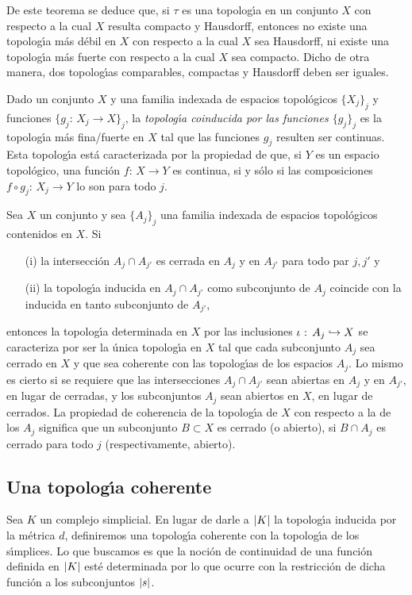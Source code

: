 De este teorema se deduce que, si $\tau$ es una topolog\'{\i}a en un conjunto
$X$ con respecto a la cual $X$ resulta compacto y Hausdorff, entonces
no existe una topolog\'{\i}a m\'{a}s d\'{e}bil en $X$ con respecto a la
cual $X$ sea Hausdorff, ni existe una topolog\'{\i}a m\'{a}s fuerte con
respecto a la cual $X$ sea compacto. Dicho de otra manera, dos topolog\'{\i}as
comparables, compactas y Hausdorff deben ser iguales.

Dado un conjunto $X$ y una familia indexada de espacios topol\'{o}gicos
$\{X_{j}\}_{j}$ y funciones $\{g_{j}:\,X_{j}\rightarrow X\}_{j}$, la
\emph{topolog\'{\i}a coinducida por las funciones $\{g_{j}\}_{j}$}
es la topolog\'{\i}a m\'{a}s fina/fuerte en $X$ tal que las funciones $g_{j}$
resulten ser continuas. Esta topolog\'{\i}a est\'{a} caracterizada por la
propiedad de que, si $Y$ es un espacio topol\'{o}gico, una funci\'{o}n
$f:\,X\rightarrow Y$ es continua, si y s\'{o}lo si las composiciones
$f\circ g_{j}:\,X_{j}\rightarrow Y$ lo son para todo $j$.

\begin{teoTopologiaCoherente}\label{thm:topologiacoherente}
	Sea $X$ un conjunto y sea $\{A_{j}\}_{j}$ una familia indexada de
	espacios topol\'{o}gicos contenidos en $X$. Si
	\begin{itemize}
		\item[(i)] la intersecci\'{o}n $A_{j}\cap A_{j'}$ es cerrada
			en $A_{j}$ y en $A_{j'}$ para todo par $j,j'$ y
		\item[(ii)] la topolog\'{\i}a inducida en $A_{j}\cap A_{j'}$
			como subconjunto de $A_{j}$ coincide con la inducida
			en tanto subconjunto de $A_{j'}$,
	\end{itemize}
	entonces la topolog\'{\i}a determinada en $X$ por las inclusiones
	$\iota_{}:\,A_{j}\hookrightarrow X$ se caracteriza por ser la \'{u}nica
	topolog\'{\i}a en $X$ tal que cada subconjunto $A_{j}$ sea
	cerrado en $X$ y que sea coherente con las topolog\'{\i}as de los
	espacios $A_{j}$. Lo mismo es cierto si se requiere que las
	intersecciones $A_{j}\cap A_{j'}$ sean abiertas en $A_{j}$ y en
	$A_{j'}$, en lugar de cerradas, y los subconjuntos $A_{j}$ sean
	abiertos en $X$, en lugar de cerrados. La propiedad de coherencia
	de la topolog\'{\i}a de $X$ con respecto a la de los $A_{j}$
	significa que un subconjunto $B\subset X$ es cerrado (o abierto), si 
	$B\cap A_{j}$ es cerrado para todo $j$ (respectivamente, abierto).
\end{teoTopologiaCoherente}

\subsection{Una topolog\'{\i}a coherente}
Sea $K$ un complejo simplicial. En lugar de darle a $\left|K\right|$ la
topolog\'{\i}a inducida por la m\'{e}trica $d$, definiremos una
topolog\'{\i}a coherente con la topolog\'{\i}a de los s\'{\i}mplices. Lo que
buscamos es que la noci\'{o}n de continuidad de una funci\'{o}n definida
en $\left|K\right|$ est\'{e} determinada por lo que ocurre con la restricci\'{o}n
de dicha funci\'{o}n a los subconjuntos $\left|s\right|$.

